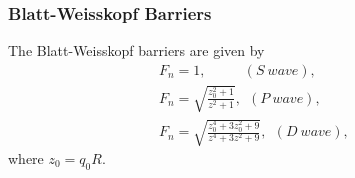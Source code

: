 {    \subsubsection{Blatt-Weisskopf Barriers}{
        The Blatt-Weisskopf barriers are given by 
        \begin{equation}
            \begin{array}{lr}
                F_{n} = 1,       \ \ \ \ \ \ \ \ \ \ \ \   (S\ wave), &\\
                F_{n} = \sqrt{\frac{z_{0}^{2}+1}{z^{2}+1}},      \ \     (P\ wave), &\\
                F_{n} = \sqrt{\frac{z_{0}^{4}+3z_{0}^{2}+9}{z^{4}+3z^{2}+9}},   \ \      (D\ wave), &
            \end{array}\label{Blatt-Weisskopf barrier} 
        \end{equation}
        where $z_{0} = q_{0}R$. 
    }

}
